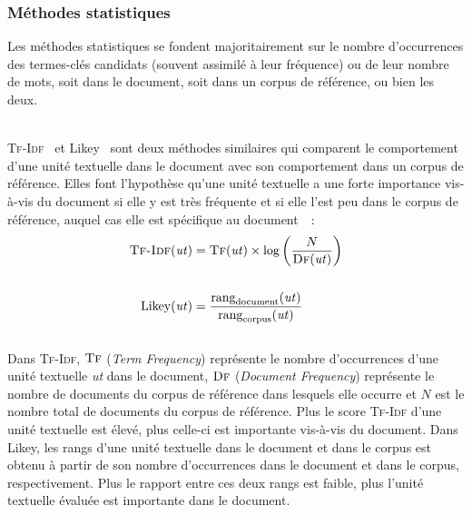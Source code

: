       \subsubsection{Méthodes statistiques}
      \label{subsubsec:main-state_of_the_art-automatic_keyphrase_extraction-unsupervised_keyphrase_extraction-statistical_approaches}
        Les méthodes statistiques se fondent majoritairement sur le nombre
        d'occurrences des ter\-mes-clés candidats (souvent assimilé à leur
        fréquence) ou de leur nombre de mots, soit dans le
        document, soit dans un corpus de référence, ou bien les deux.

        ~\\\textsc{Tf-Idf}~\cite{salton1975tfidf} et Likey~\cite{paukkeri2010likey}
        sont deux méthodes similaires qui comparent le comportement d'une unité
        textuelle dans le document avec son comportement dans un corpus de
        référence. Elles font l'hypothèse qu'une unité textuelle a une forte
        importance vis-à-vis du document si elle y est très fréquente et si elle
        l'est peu dans le corpus de référence, auquel cas elle est spécifique au
        document~\cite{jones1972tfidf}~:
        \begin{align}
          \text{\textsc{Tf-Idf}}(\text{\textit{ut}}) &= \textsc{Tf}(\text{\textit{ut}}) \times \log\left(\frac{N}{\textsc{Df}(\text{\textit{ut}})}\right) \label{math:tfidf}\\
          \notag\\
          \text{Likey}(\text{\textit{ut}}) &= \frac{\text{rang}_{\text{document}}(\text{\textit{ut}})}{\text{rang}_{\text{corpus}}(\text{\textit{ut}})} \label{math:likey}
        \end{align}\\
        Dans \textsc{Tf-Idf}, $\textsc{Tf}$ (\textit{Term Frequency}) représente
        le nombre d'occurrences d'une unité textuelle \textit{ut} dans le
        document, $\textsc{Df}$ (\textit{Document Frequency}) représente le
        nombre de documents du corpus de référence dans lesquels elle occurre
        et $N$ est le nombre total de documents du corpus de référence. Plus le
        score \textsc{Tf-Idf} d'une unité textuelle est élevé, plus celle-ci est
        importante vis-à-vis du document. Dans Likey, les rangs d'une unité
        textuelle dans le document et dans le corpus est obtenu à partir de son
        nombre d'occurrences dans le document et dans le corpus, respectivement.
        Plus le rapport entre ces deux rangs est faible, plus l'unité textuelle
        évaluée est importante dans le document.

